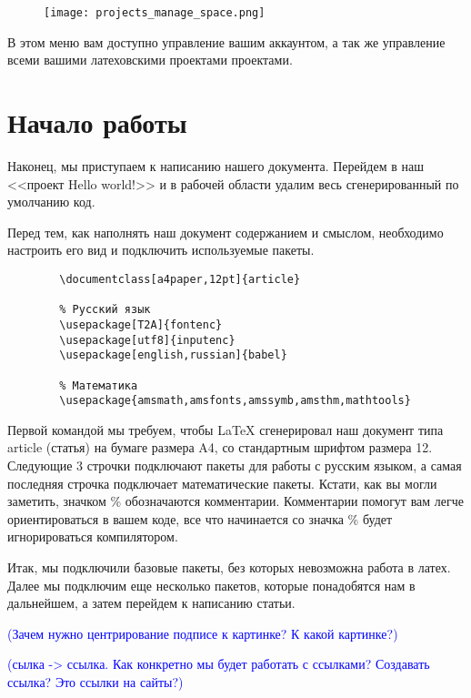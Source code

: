     \begin{figure}[h!]
        \centering
        \texttt{[image: projects\_manage\_space.png]}
        \caption{}
    \end{figure}

    В этом меню вам доступно управление вашим аккаунтом, а так же управление всеми вашими латеховскими проектами проектами.

    \section{Начало работы}

    Наконец, мы приступаем к написанию нашего документа. Перейдем в наш <<проект Hello world!>> и в рабочей области удалим весь сгенерированный по умолчанию код.

    Перед тем, как наполнять наш документ содержанием и смыслом, необходимо настроить его вид и подключить используемые пакеты.

    \begin{verbatim}
        \documentclass[a4paper,12pt]{article}

        % Русский язык
        \usepackage[T2A]{fontenc}
        \usepackage[utf8]{inputenc}	
        \usepackage[english,russian]{babel}

        % Математика
        \usepackage{amsmath,amsfonts,amssymb,amsthm,mathtools} 
    \end{verbatim}

    Первой командой мы требуем, чтобы \LaTeX{} сгенерировал наш документ типа article (статья) на бумаге размера A4, со стандартным шрифтом размера 12.
    Следующие 3 строчки подключают пакеты для работы с русским языком, а самая последняя строчка подключает математические пакеты.
    Кстати, как вы могли заметить, значком \% обозначаются комментарии. Комментарии помогут вам легче ориентироваться в вашем коде,
    все что начинается со значка \% будет игнорироваться компилятором.
    
    Итак, мы подключили базовые пакеты, без которых невозможна работа в латех. Далее мы подключим еще
    несколько пакетов, которые понадобятся нам в дальнейшем, а затем перейдем к написанию статьи.

    \textcolor{Blue}{(Зачем нужно центрирование подписе к картинке? К какой картинке?)}

    \textcolor{Blue}{(сылка -> ссылка. Как конкретно мы будет работать с ссылками? Создавать ссылка? Это ссылки на сайты?)}

